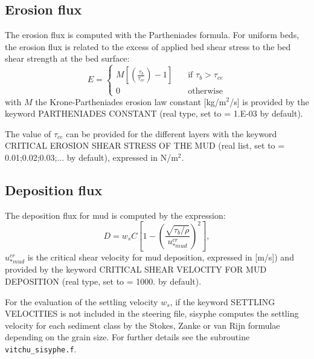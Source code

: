 \subsection{Erosion flux}
The erosion flux is computed with the Partheniades formula. For uniform beds, the erosion flux is related to the excess of
applied bed shear stress to the bed shear strength at the bed surface:
\begin{equation*}
E = \left\{\begin{array}{ll}
M\left[\left(\frac{\tau_b}{\tau_{ce}}\right)-1\right]\quad & \text{if}\,\,\tau_b> \tau_{ce}\\  
0\quad & \text{otherwise}
\end{array}
\right. 
\end{equation*}
with $M$ the Krone-Partheniades erosion law constant [kg/m$^2$/s] is provided by the keyword {\ttfamily PARTHENIADES CONSTANT} (real type, set to {\ttfamily = 1.E-03} by default).

The value of $\tau_{ce}$ can be provided for the different layers with the keyword {\ttfamily CRITICAL EROSION SHEAR STRESS OF THE MUD} (real list, set to {\ttfamily = 0.01;0.02;0.03;...} by default), expressed in N/m$^2$.

\subsection{Deposition flux}
The deposition flux for mud is computed by the expression:
\begin{equation}
D = w_{s} C \left[1-\left(\frac{\sqrt{\tau_b/\rho}}{u_{*mud}^{cr}}\right)^2 \right],
\end{equation}
$u_{*mud}^{cr}$ is the critical shear velocity for mud deposition, expressed in [m/s]) and provided by the keyword {\ttfamily CRITICAL SHEAR VELOCITY FOR MUD DEPOSITION} (real type, set to {\ttfamily = 1000.} by default).

For the evaluation of the settling velocity $w_s $, if the keyword {\ttfamily SETTLING VELOCITIES} is not included in the steering file, sisyphe{} computes the settling velocity for each sediment class by the Stokes, Zanke or van Rijn formulae depending on the grain size. For further details see the subroutine \texttt{vitchu\_sisyphe.f}.

